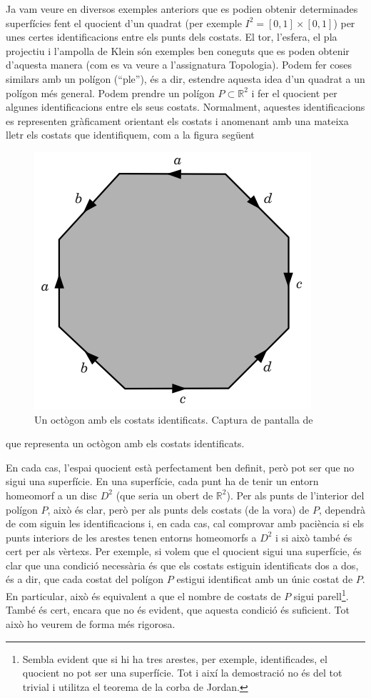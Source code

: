 \documentclass[../main.tex]{subfiles}
\begin{document}
Ja vam veure en diversos exemples anteriors que es podien obtenir determinades superfícies fent el quocient d'un quadrat (per exemple $I^2 = [0,1]\times[0,1]$) per unes certes identificacions entre els punts dels costats. El tor, l'esfera, el pla projectiu i l'ampolla de Klein són exemples ben coneguts que es poden obtenir d'aquesta manera (com es va veure a l'assignatura Topologia). Podem fer coses similars amb un polígon (``ple''), és a dir, estendre aquesta idea d'un quadrat a un polígon més general. Podem prendre un polígon $P\subset \mathbb{R}^2$ i fer el quocient per algunes identificacions entre els seus costats. Normalment, aquestes identificacions es representen gràficament orientant els costats i anomenant amb una mateixa lletr els costats que identifiquem, com a la figura següent
\begin{figure}
    \centering
    \includegraphics[scale = 0.6]{fotos_topo_2/octogonid.png}
    \caption{Un octògon amb els costats identificats. Captura de pantalla de \cite{aguade}}
    \label{fig:octogon}
\end{figure}
que representa un octògon amb els costats identificats.

En cada cas, l'espai quocient està perfectament ben definit, però pot ser que no sigui una superfície. En una superfície, cada punt ha de tenir un entorn homeomorf a un disc $D^2$ (que seria un obert de $\mathbb{R}^2$). Per als punts de l'interior del polígon $P$, això és clar, però per als punts dels costats (de la vora) de $P$, dependrà de com siguin les identificacions i, en cada cas, cal comprovar amb paciència si els punts interiors de les arestes tenen entorns homeomorfs a $D^2$ i si això també és cert per als vèrtexs. Per exemple, si volem que el quocient sigui una superfície, és clar que una condició necessària és que els costats estiguin identificats dos a dos, és a dir, que cada costat del polígon $P$ estigui identificat amb un únic costat de $P$. En particular, això és equivalent a que el nombre de costats de $P$ sigui parell\footnote{Sembla evident que si hi ha tres arestes, per exemple, identificades, el quocient no pot ser una superfície. Tot i així la demostració no és del tot trivial i utilitza el teorema de la corba de Jordan.}. També és cert, encara que no és evident, que aquesta condició és suficient. Tot això ho veurem de forma més rigorosa.
\end{document}
